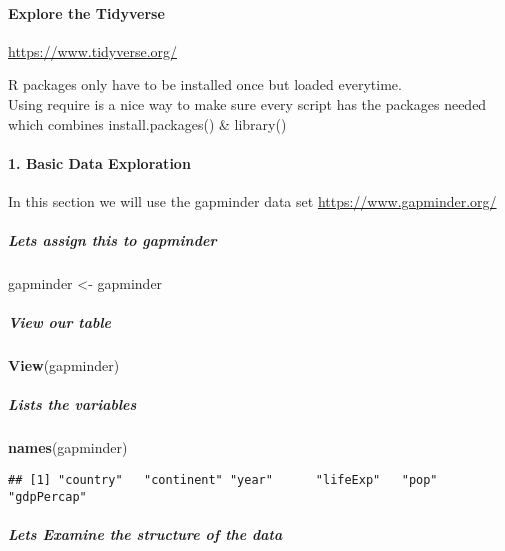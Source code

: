 \documentclass[]{article}
\newenvironment{Shaded}{\begin{snugshade}}{\end{snugshade}}
\newcommand{\KeywordTok}[1]{\textcolor[rgb]{0.13,0.29,0.53}{\textbf{#1}}}
\newcommand{\StringTok}[1]{\textcolor[rgb]{0.31,0.60,0.02}{#1}}
\newcommand{\NormalTok}[1]{#1}
\let\oldparagraph\paragraph
\renewcommand{\paragraph}[1]{\oldparagraph{#1}\mbox{}}
\let\oldsubparagraph\subparagraph
\renewcommand{\subparagraph}[1]{\oldsubparagraph{#1}\mbox{}}
\begin{document}
\paragraph{Explore the Tidyverse}\label{explore-the-tidyverse}

\url{https://www.tidyverse.org/}

R packages only have to be installed once but loaded everytime.\\
Using require is a nice way to make sure every script has the packages
needed which combines install.packages() \& library()

\paragraph{1. Basic Data Exploration}\label{basic-data-exploration}

In this section we will use the gapminder data set
\url{https://www.gapminder.org/}

\subparagraph{Lets assign this to
gapminder}\label{lets-assign-this-to-gapminder}

\begin{Shaded}
\begin{Highlighting}[]
\NormalTok{gapminder <-}\StringTok{ }\NormalTok{gapminder}
\end{Highlighting}
\end{Shaded}

\subparagraph{View our table}\label{view-our-table}

\begin{Shaded}
\begin{Highlighting}[]
\KeywordTok{View}\NormalTok{(gapminder)}
\end{Highlighting}
\end{Shaded}

\subparagraph{Lists the variables}\label{lists-the-variables}

\begin{Shaded}
\begin{Highlighting}[]
\KeywordTok{names}\NormalTok{(gapminder)}
\end{Highlighting}
\end{Shaded}

\begin{verbatim}
## [1] "country"   "continent" "year"      "lifeExp"   "pop"       "gdpPercap"
\end{verbatim}

\subparagraph{Lets Examine the structure of the
data}\label{lets-examine-the-structure-of-the-data}
\end{document}
